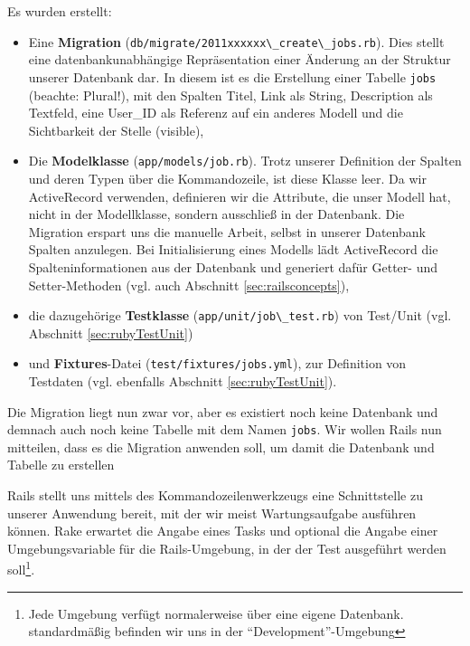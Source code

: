 Es wurden erstellt:
\begin{itemize}
 \item Eine \textbf{Migration} (\verb|db/migrate/2011xxxxxx\_create\_jobs.rb|). Dies stellt eine datenbankunabhängige Repräsentation einer Änderung an der Struktur unserer Datenbank dar. In diesem ist es die Erstellung einer Tabelle \texttt{jobs} (beachte: Plural!), mit den Spalten Titel, Link als String, Description als Textfeld, eine User\_ID als Referenz auf ein anderes Modell und die Sichtbarkeit der Stelle (visible),
 \item Die \textbf{Modelklasse} (\verb|app/models/job.rb|). Trotz unserer Definition der Spalten und deren Typen über die Kommandozeile, ist diese Klasse leer. Da wir ActiveRecord verwenden, definieren wir die Attribute, die unser Modell hat, nicht in der Modellklasse, sondern ausschließ in der Datenbank. Die Migration erspart uns die manuelle Arbeit, selbst in unserer Datenbank Spalten anzulegen. Bei Initialisierung eines Modells lädt ActiveRecord die Spalteninformationen aus der Datenbank und generiert dafür Getter- und Setter-Methoden (vgl. auch Abschnitt \ref{sec:railsconcepts}),
 \item die dazugehörige \textbf{Testklasse} (\verb|app/unit/job\_test.rb|) von Test/Unit (vgl. Abschnitt \ref{sec:rubyTestUnit})
 \item und \textbf{Fixtures}-Datei (\verb|test/fixtures/jobs.yml|), zur Definition von Testdaten (vgl. ebenfalls Abschnitt \ref{sec:rubyTestUnit}).
\end{itemize}

Die Migration liegt nun zwar vor, aber es existiert noch keine Datenbank und demnach auch noch keine Tabelle mit dem Namen \texttt{jobs}.
Wir wollen Rails nun mitteilen, dass es die Migration anwenden soll, um damit die Datenbank und Tabelle zu erstellen

Rails stellt uns mittels des Kommandozeilenwerkzeugs \textbf{} eine Schnittstelle zu unserer Anwendung bereit, mit der wir meist Wartungsaufgabe ausführen können. Rake erwartet die Angabe eines Tasks und optional die Angabe einer Umgebungsvariable für die Rails-Umgebung, in der der Test ausgeführt werden soll\footnote{Jede Umgebung verfügt normalerweise über eine eigene Datenbank. standardmäßig befinden wir uns in der "`Development"'-Umgebung}.

